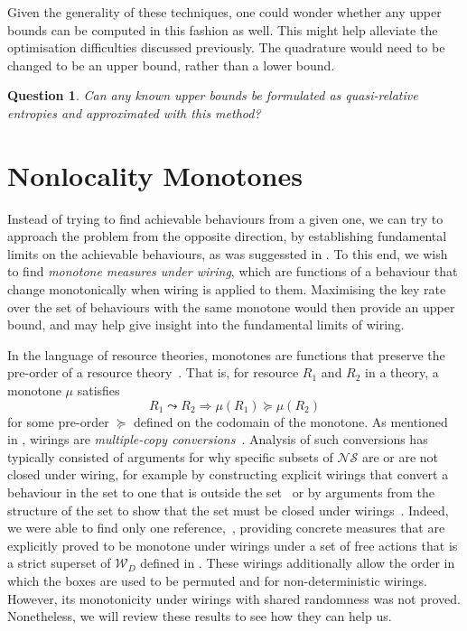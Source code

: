 \documentclass[10pt, a4paper]{article}
\numberwithin{equation}{section} %
\theoremstyle{definition}
\theoremstyle{plain}
\newtheorem{question}{Question}
\newcommand{\?}{\mathrel{?}} %
\newcommand{\sW}{\mathcal{W}}
\newcommand{\NSs}{\mathcal{NS}}
\begin{document}
      Given the generality of these techniques, one could wonder whether any upper bounds can be computed in this fashion as well. This might help alleviate the optimisation difficulties discussed previously. The quadrature would need to be changed to be an upper bound, rather than a lower bound.
      \begin{question}
        Can any known upper bounds be formulated as quasi-relative entropies and approximated with this method?
      \end{question}

    \section{Nonlocality Monotones}\label{sec:nlmono}

    Instead of trying to find achievable behaviours from a given one, we can try to approach the problem from the opposite direction, by establishing fundamental limits on the achievable behaviours, as was suggessted in . To this end, we wish to find \emph{monotone measures under wiring}, which are functions of a behaviour that change monotonically when wiring is applied to them. Maximising the key rate over the set of behaviours with the same monotone would then provide an upper bound, and may help give insight into the fundamental limits of wiring.

    In the language of resource theories, monotones are functions that preserve the pre-order of a resource theory~\cite{BellResourceTheory}. That is, for resource \(R_1\) and \(R_2\) in a theory, a monotone \(\mu\) satisfies
    \begin{equation}
      R_1 \leadsto R_2 \Rightarrow \mu(R_1) \succeq \mu(R_2)
    \end{equation}
    for some pre-order \(\succeq\) defined on the codomain of the monotone. As mentioned in , wirings are \emph{multiple-copy conversions}~\cite{BellResourceTheory}. Analysis of such conversions has typically consisted of arguments for why specific subsets of \(\NSs\) are or are not closed under wiring, for example by constructing explicit wirings that convert a behaviour in the set to one that is outside the set~\cite{ClosedCorrSets} or by arguments from the structure of the set to show that the set must be closed under wirings~\cite{NonlocalZoo}. Indeed, we were able to find only one reference,~\cite{NLMonotones}, providing concrete measures that are explicitly proved to be monotone under wirings under a set of free actions that is a strict superset of \(\sW_D\) defined in . These wirings additionally allow the order in which the boxes are used to be permuted and for non-deterministic wirings. However, its monotonicity under wirings with shared randomness was not proved. Nonetheless, we will review these results to see how they can help us.
\end{document}
